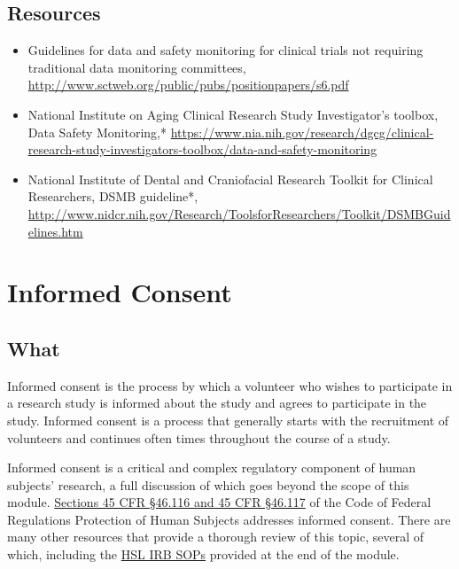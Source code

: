\documentclass[]{book}
\providecommand{\tightlist}{%
  \setlength{\itemsep}{0pt}\setlength{\parskip}{0pt}}
\theoremstyle{definition}
\theoremstyle{definition}
\theoremstyle{definition}
\theoremstyle{remark}
\begin{document}
\subsection{Resources}\label{resources-8}

\begin{itemize}
\tightlist
\item
  Guidelines for data and safety monitoring for clinical trials not
  requiring traditional data monitoring committees,
  \url{http://www.sctweb.org/public/pubs/positionpapers/s6.pdf}
\item
  National Institute on Aging Clinical Research Study Investigator's
  toolbox, Data Safety Monitoring,*
  \url{https://www.nia.nih.gov/research/dgcg/clinical-research-study-investigators-toolbox/data-and-safety-monitoring}
\item
  National Institute of Dental and Craniofacial Research Toolkit for
  Clinical Researchers, DSMB guideline*,
  \url{http://www.nidcr.nih.gov/Research/ToolsforResearchers/Toolkit/DSMBGuidelines.htm}
\end{itemize}

\section{Informed Consent}\label{informed-consent}

\subsection{What}\label{what-10}

Informed consent is the process by which a volunteer who wishes to
participate in a research study is informed about the study and agrees
to participate in the study. Informed consent is a process that
generally starts with the recruitment of volunteers and continues often
times throughout the course of a study.

Informed consent is a critical and complex regulatory component of human
subjects' research, a full discussion of which goes beyond the scope of
this module.
\href{http://www.hhs.gov/ohrp/regulations-and-policy/regulations/45-cfr-46/index.html}{Sections
45 CFR §46.116 and 45 CFR §46.117} of the Code of Federal Regulations
Protection of Human Subjects addresses informed consent. There are many
other resources that provide a thorough review of this topic, several of
which, including the
\href{http://thehslhub/~/media/HSLNet/Docs/IFAR/IRB/IRB_SOP.ashx}{HSL
IRB SOPs} provided at the end of the module.
\end{document}
